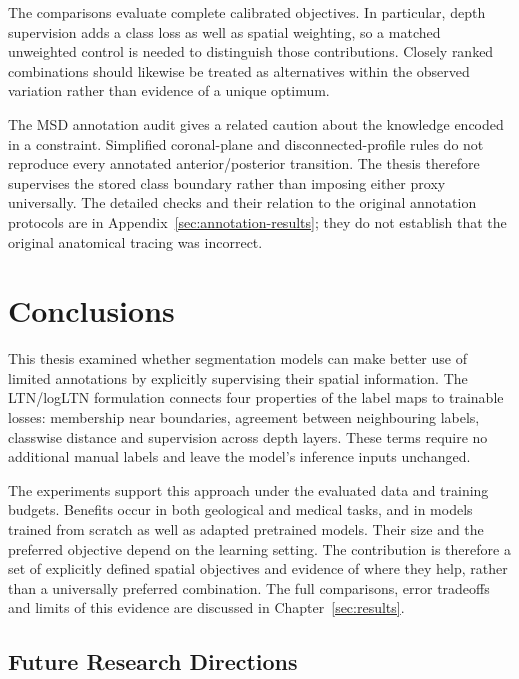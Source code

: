 \documentclass[12pt,a4paper]{article}
\begin{document}
The comparisons evaluate complete calibrated objectives. In particular,
depth supervision adds a class loss as well as spatial weighting, so
a matched unweighted control is needed to distinguish those contributions.
Closely ranked combinations should likewise be treated as alternatives
within the observed variation rather than evidence of a unique optimum.

The MSD annotation audit gives a related caution about the knowledge
encoded in a constraint. Simplified coronal-plane and disconnected-profile
rules do not reproduce every annotated anterior/posterior transition.
The thesis therefore supervises the stored class boundary rather than
imposing either proxy universally. The detailed checks and their relation
to the original annotation protocols are in
Appendix~\ref{sec:annotation-results}; they do not establish that the
original anatomical tracing was incorrect.

\clearpage

\section{Conclusions}\label{sec:conclusions}

This thesis examined whether segmentation models can make better use of
limited annotations by explicitly supervising their spatial information.
The LTN/logLTN formulation connects four properties of the label maps to
trainable losses: membership near boundaries, agreement between
neighbouring labels, classwise distance and supervision across depth
layers. These terms require no additional manual labels and leave the
model's inference inputs unchanged.

The experiments support this approach under the evaluated data and
training budgets. Benefits occur in both geological and medical tasks,
and in models trained from scratch as well as adapted pretrained models.
Their size and the preferred objective depend on the learning setting.
The contribution is therefore a set of explicitly defined spatial
objectives and evidence of where they help, rather than a universally
preferred combination. The full comparisons, error tradeoffs and limits
of this evidence are discussed in Chapter~\ref{sec:results}.

\subsection{Future Research Directions}\label{sec:future-work}
\label{sec:pending-results}
\end{document}
